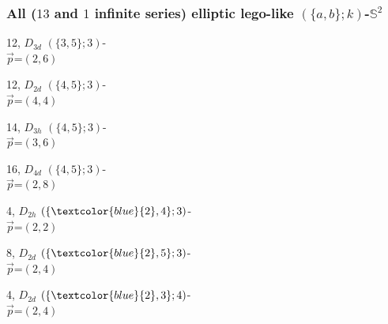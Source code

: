 \documentclass{beamer}
\begin{document}
\begin{frame}\frametitle{All ($13$ and $1$ infinite series) elliptic lego-like   $(\{a,b\}; k)$-$\mathbb{S}^2$}
\vspace{-3mm}
\tiny
\begin{center}
\begin{minipage}{19mm}
\centering
{}\par
12, $D_{3d}$
$(\{3,5\};3)$-\\
$\vec{p}$=$(2,6)$
\end{minipage}
\begin{minipage}{19mm}
\centering
{}\par
12, $D_{2d}$
$(\{4,5\};3)$-\\
$\vec{p}$=$(4,4)$
\end{minipage}
\begin{minipage}{19mm}
\centering
{}\par
14, $D_{3h}$
$(\{4,5\};3)$-\\
$\vec{p}$=$(3,6)$
\end{minipage}
\begin{minipage}{19mm}
\centering
{}\par
16, $D_{4d}$
$(\{4,5\};3)$-\\
$\vec{p}$=$(2,8)$
\end{minipage}
\begin{minipage}{19mm}\centering
{}\par
4, $D_{2h}$
$(\{\textcolor{blue}{2}, 4\};3)$-\\
$\vec{p}$=$(2,2)$
\end{minipage}
\hspace{3mm}
\begin{minipage}{19mm}\centering
{}\par
8, $D_{2d}$
$(\{\textcolor{blue}{2}, 5\};3)$-\\
$\vec{p}$=$(2,4)$
\end{minipage}
\begin{minipage}{19mm}\centering
{}\par
4, $D_{2d}$
$(\{\textcolor{blue}{2}, 3\};4)$-\\
$\vec{p}$=$(2,4)$
\end{minipage}

\end{center}
\end{frame}
\end{document}

